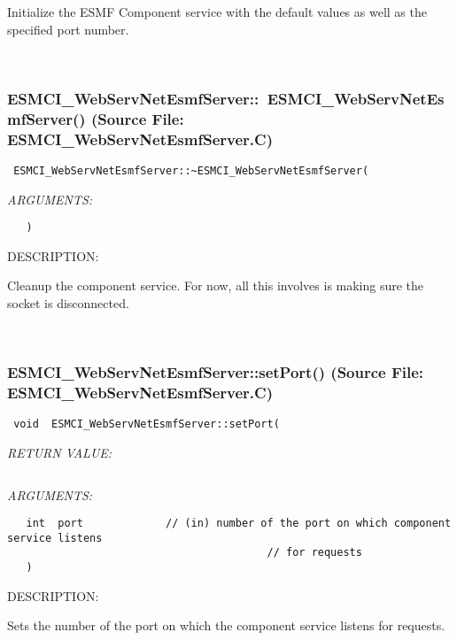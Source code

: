       Initialize the ESMF Component service with the default values as well
      as the specified port number.
   
 
\mbox{}\hrulefill\
 
\subsubsection{ESMCI\_WebServNetEsmfServer::~ESMCI\_WebServNetEsmfServer() (Source File: ESMCI\_WebServNetEsmfServer.C)}


  
\begin{verbatim} ESMCI_WebServNetEsmfServer::~ESMCI_WebServNetEsmfServer(\end{verbatim}{\em ARGUMENTS:}
\begin{verbatim}   )\end{verbatim}
{\sf DESCRIPTION:\\ }


      Cleanup the component service.  For now, all this involves is making
      sure the socket is disconnected.
   
 
\mbox{}\hrulefill\
 
\subsubsection{ESMCI\_WebServNetEsmfServer::setPort() (Source File: ESMCI\_WebServNetEsmfServer.C)}


  
\begin{verbatim} void  ESMCI_WebServNetEsmfServer::setPort(\end{verbatim}{\em RETURN VALUE:}
\begin{verbatim} \end{verbatim}{\em ARGUMENTS:}
\begin{verbatim}   int  port             // (in) number of the port on which component service listens
                                         // for requests
   )\end{verbatim}
{\sf DESCRIPTION:\\ }


      Sets the number of the port on which the component service listens
      for requests.
   
